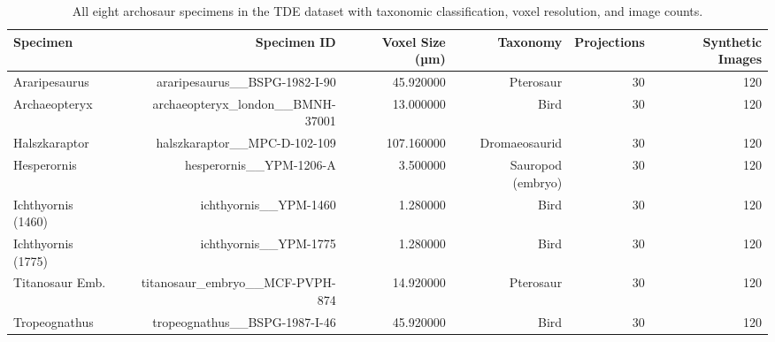 \begin{table}[htbp]
\caption{All eight archosaur specimens in the TDE dataset with taxonomic classification, voxel resolution, and image counts.}
\label{tab:all_specimens}
\begin{tabular}{lrrrrr}
\toprule
Specimen & Specimen ID & Voxel Size (µm) & Taxonomy & Projections & Synthetic Images \\
\midrule
Araripesaurus & araripesaurus\_\_BSPG-1982-I-90 & 45.920000 & Pterosaur & 30 & 120 \\
Archaeopteryx & archaeopteryx\_london\_\_BMNH-37001 & 13.000000 & Bird & 30 & 120 \\
Halszkaraptor & halszkaraptor\_\_MPC-D-102-109 & 107.160000 & Dromaeosaurid & 30 & 120 \\
Hesperornis & hesperornis\_\_YPM-1206-A & 3.500000 & Sauropod (embryo) & 30 & 120 \\
Ichthyornis (1460) & ichthyornis\_\_YPM-1460 & 1.280000 & Bird & 30 & 120 \\
Ichthyornis (1775) & ichthyornis\_\_YPM-1775 & 1.280000 & Bird & 30 & 120 \\
Titanosaur Emb. & titanosaur\_embryo\_\_MCF-PVPH-874 & 14.920000 & Pterosaur & 30 & 120 \\
Tropeognathus & tropeognathus\_\_BSPG-1987-I-46 & 45.920000 & Bird & 30 & 120 \\
\bottomrule
\end{tabular}
\end{table}
